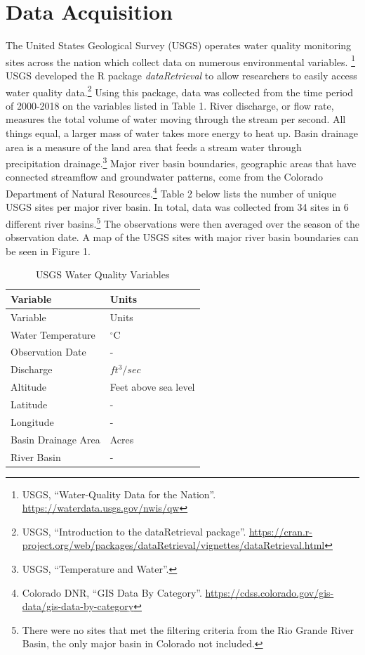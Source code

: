 \documentclass[
]{article}
\begin{document}
\hypertarget{data-acquisition}{%
\section{Data Acquisition}\label{data-acquisition}}

The United States Geological Survey (USGS) operates water quality
monitoring sites across the nation which collect data on numerous
environmental variables. \footnote{USGS, ``Water-Quality Data for the
  Nation''. \url{https://waterdata.usgs.gov/nwis/qw}} USGS developed the
R package \emph{dataRetrieval} to allow researchers to easily access
water quality data.\footnote{USGS, ``Introduction to the dataRetrieval
  package''.
  \url{https://cran.r-project.org/web/packages/dataRetrieval/vignettes/dataRetrieval.html}}
Using this package, data was collected from the time period of 2000-2018
on the variables listed in Table 1. River discharge, or flow rate,
measures the total volume of water moving through the stream per second.
All things equal, a larger mass of water takes more energy to heat up.
Basin drainage area is a measure of the land area that feeds a stream
water through precipitation drainage.\footnote{USGS, ``Temperature and
  Water''.} Major river basin boundaries, geographic areas that have
connected streamflow and groundwater patterns, come from the Colorado
Department of Natural Resources.\footnote{Colorado DNR, ``GIS Data By
  Category''.
  \url{https://cdss.colorado.gov/gis-data/gis-data-by-category}} Table 2
below lists the number of unique USGS sites per major river basin. In
total, data was collected from 34 sites in 6 different river
basins.\footnote{There were no sites that met the filtering criteria
  from the Rio Grande River Basin, the only major basin in Colorado not
  included.} The observations were then averaged over the season of the
observation date. A map of the USGS sites with major river basin
boundaries can be seen in Figure 1.

\begin{longtable}[]{@{}
  >{\centering\arraybackslash}p{}
  >{\centering\arraybackslash}p{}@{}}
\caption{USGS Water Quality Variables}\tabularnewline
\toprule
Variable & Units \\
\midrule
\endfirsthead
\toprule
Variable & Units \\
\midrule
\endhead
Water Temperature & \(^\circ\)C \\
Observation Date & - \\
Discharge & \(ft^3 \slash sec\) \\
Altitude & Feet above sea level \\
Latitude & - \\
Longitude & - \\
Basin Drainage Area & Acres \\
River Basin & - \\
\bottomrule
\end{longtable}
\end{document}
